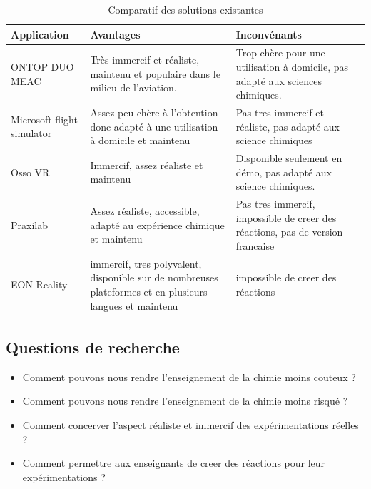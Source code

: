 \begin{table}[H]
	\centering
	\caption{Comparatif des solutions existantes}
	\begin{tabular}{|l|p{5cm}|p{5cm}|}
		\hline
		\textbf{Application}       & \textbf{Avantages}                                                                                      & \textbf{Inconvénants}                                                          \\ \hline
		ONTOP DUO MEAC             & Très immercif et réaliste, maintenu et populaire dans le milieu de l'aviation.                          & Trop chère pour une utilisation à domicile, pas adapté aux sciences chimiques. \\ \hline
		Microsoft flight simulator & Assez peu chère à l'obtention donc adapté à une utilisation à domicile et maintenu                      & Pas tres immercif et réaliste, pas adapté aux science chimiques                \\ \hline
		Osso VR                    & Immercif, assez réaliste et maintenu                                                                    & Disponible seulement en démo, pas adapté aux science chimiques.                \\ \hline
		Praxilab                   & Assez réaliste, accessible, adapté au expérience chimique et maintenu                                   & Pas tres immercif, impossible de creer des réactions, pas de version francaise \\ \hline
		EON Reality                & immercif, tres polyvalent, disponible sur de nombreuses plateformes et en plusieurs langues et maintenu & impossible de creer des réactions                                              \\ \hline
	\end{tabular}
\end{table}

\subsection{Questions de recherche}

\begin{itemize}
	\item Comment pouvons nous rendre l'enseignement de la chimie moins couteux ?
	\item Comment pouvons nous rendre l'enseignement de la chimie moins risqué ?
	\item Comment concerver l'aspect réaliste et immercif des expérimentations réelles ?
	\item Comment permettre aux enseignants de creer des réactions pour leur expérimentations ?
\end{itemize}

